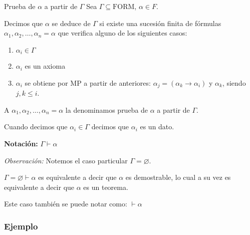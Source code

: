 \begin{definicion}{Prueba de $\alpha$ a partir de $\Gamma$}{}
    Sea $\Gamma \subseteq \mathrm{FORM}$, $\alpha \in F$.

    \medskip

    Decimos que $\alpha$ se deduce de $\Gamma$ si existe una sucesión finita
    de fórmulas $\alpha_1, \alpha_2, \dotsc, \alpha_n = \alpha$ que verifica
    alguno de los siguientes casos:

    \begin{center}
        \begin{enumerate}[%
                        labelindent=*,
                        style=multiline,
                        leftmargin=*,
                        align=left,
                        leftmargin=2\parindent,
                        label=Caso \arabic*)]
            \item $\alpha_i \in \Gamma$ %
            \item $\alpha_i$ es un axioma %
            \item $\alpha_i$ se obtiene por MP a partir de anteriores:
                $\alpha_j = (\alpha_k \to \alpha_i)$ y $\alpha_k$, siendo 
                $j, k \leq i$.
        \end{enumerate}
    \end{center}

    A $\alpha_1, \alpha_2, \dotsc, \alpha_n = \alpha$ la denominamos
    prueba de $\alpha$ a partir de $\Gamma$.

    Cuando decimos que $\alpha_i \in \Gamma$ decimos que $\alpha_i$ es un 
    dato.

    \bigskip
    \textbf{Notación:}
    $\Gamma \vdash \alpha$
    
\end{definicion}


\bigskip
\textit{Observación:}
Notemos el caso particular $\Gamma = \varnothing$.

$\Gamma = \varnothing \vdash \alpha$ es equivalente a decir que $\alpha$ es
demostrable, lo cual a su vez es equivalente a decir que $\alpha$ es un
teorema. 

Este caso también se puede notar como: $\vdash \alpha$


\subsubsection{Ejemplo}

